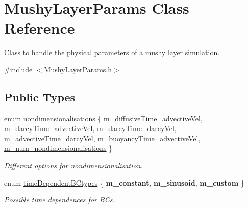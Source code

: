\hypertarget{class_mushy_layer_params}{}\section{Mushy\+Layer\+Params Class Reference}
\label{class_mushy_layer_params}


Class to handle the physical parameters of a mushy layer simulation.  




{\ttfamily \#include $<$Mushy\+Layer\+Params.\+h$>$}

\subsection*{Public Types}
\begin{DoxyCompactItemize}
\item 
enum \hyperlink{class_mushy_layer_params_a9de94ba9465c51de9b37fc946622bee8}{nondimensionalisations} \{ \newline
\hyperlink{class_mushy_layer_params_a9de94ba9465c51de9b37fc946622bee8a0a6a16ab5fc194f854e89368f43c7c19}{m\+\_\+diffusive\+Time\+\_\+advective\+Vel}, 
\hyperlink{class_mushy_layer_params_a9de94ba9465c51de9b37fc946622bee8acbb36c4d62aacfa031e24bdeccd628eb}{m\+\_\+darcy\+Time\+\_\+advective\+Vel}, 
\hyperlink{class_mushy_layer_params_a9de94ba9465c51de9b37fc946622bee8aaadfdd616da7cb4dbaab31e60d5d12e7}{m\+\_\+darcy\+Time\+\_\+darcy\+Vel}, 
\hyperlink{class_mushy_layer_params_a9de94ba9465c51de9b37fc946622bee8ae83bbc932e7440f2a95c09628e7b9451}{m\+\_\+advective\+Time\+\_\+darcy\+Vel}, 
\newline
\hyperlink{class_mushy_layer_params_a9de94ba9465c51de9b37fc946622bee8a53a77635db4cc741e10e7d2ddaaa3236}{m\+\_\+buoyancy\+Time\+\_\+advective\+Vel}, 
\hyperlink{class_mushy_layer_params_a9de94ba9465c51de9b37fc946622bee8ad984db365974fb0878c4a138d41c5ead}{m\+\_\+num\+\_\+nondimensionalisations}
 \}\begin{DoxyCompactList}\small\item\em Different options for nondimensionalisation. \end{DoxyCompactList}
\item 
enum \hyperlink{class_mushy_layer_params_a029cd583b3d31671363f600177a885ac}{time\+Dependent\+B\+Ctypes} \{ {\bfseries m\+\_\+constant}, 
{\bfseries m\+\_\+sinusoid}, 
{\bfseries m\+\_\+custom}
 \}\begin{DoxyCompactList}\small\item\em Possible time dependences for B\+Cs. \end{DoxyCompactList}
\end{DoxyCompactItemize}
